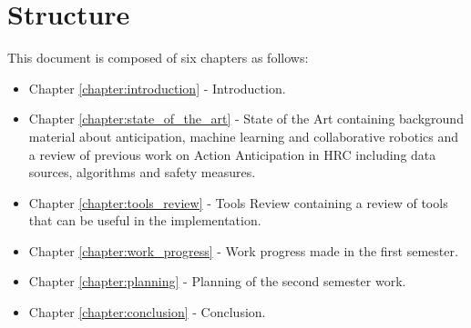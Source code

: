 \section{Structure}

This document is composed of six chapters as follows:

\begin{itemize}
\item Chapter \ref{chapter:introduction} - Introduction.
\item Chapter \ref{chapter:state_of_the_art} - State of the Art containing background material about anticipation, machine learning and collaborative robotics and a review of previous work on Action Anticipation in HRC including data sources, algorithms and safety measures.
\item Chapter \ref{chapter:tools_review} - Tools Review containing a review of tools that can be useful in the implementation.
\item Chapter \ref{chapter:work_progress} - Work progress made in the first semester.
\item Chapter \ref{chapter:planning} - Planning of the second semester work.
\item Chapter \ref{chapter:conclusion} - Conclusion.
\end{itemize}
